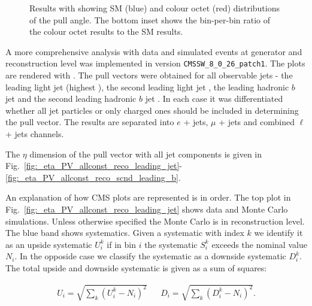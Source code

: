 \begin{figure}[htp]
\centering
  \def\twidth{0.45}
  \centering
  \hfil
\caption{Results with \RIVET showing SM (blue) and \PW colour octet (red) distributions of the pull angle. The bottom inset shows the bin-per-bin ratio of the \PW colour octet results to the SM results.}
\label{fig:resultsRivet}
\end{figure}

A more comprehensive analysis with data and simulated events at generator and reconstruction level was implemented in \CMSSW version \lstinline[language=sh]|CMSSW_8_0_26_patch1|. The plots are rendered with \ROOT \cite{Brun}. The pull vectors were obtained for all observable jets - the leading light jet \leadingjet (highest \pt), the second leading light jet \scndleadingjet, the leading hadronic $b$ jet \leadingb and the second leading hadronic $b$ jet \scndleadingb. In each case it was differentiated whether all jet particles or only charged ones should be included in determining the pull vector. The results are separated into $e$ + jets, $\mu$ + jets and combined $\ell$ + jets channels.

The $\eta$ dimension of the pull vector with all jet components is given in Fig.~\ref{fig:_eta_PV_allconst_reco_leading_jet}-\ref{fig:_eta_PV_allconst_reco_scnd_leading_b}.

An explanation of how CMS plots are represented is in order. The top plot in Fig.~\ref{fig:_eta_PV_allconst_reco_leading_jet} shows data and Monte Carlo simulations. Unless otherwise specified the Monte Carlo is in reconstruction level. The blue band shows systematics. Given a systematic with index $k$ we identify it as an upside systematic $U^{k}_{i}$ if in bin $i$ the systematic $S^{k}_i$ exceeds the nominal value $N_{i}$. In the opposide case we classify the systematic as a downside systematic $D^{k}_{i}$. The total upside and downside systematic is given as a sum of squares:

\begin{align}
U_{i}=\sqrt{\sum_{k}\left(U^{k}_{i}-N_{i}\right)^{2}} && D_{i}=\sqrt{\sum_{k}\left(D^{k}_{i}-N_{i}\right)^{2}}.
\end{align}

